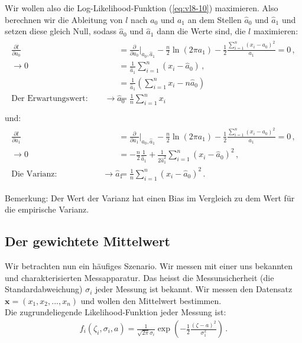 Wir wollen also die Log-Likelihood-Funktion (\cref{eq:vl8-10}) maximieren. Also berechnen wir die Ableitung von $l$ nach $a_0$ und $a_1$ an dem Stellen $\hat{a}_0$ und $\hat{a}_1$ und setzen diese gleich Null, sodass $\hat{a}_0$ und $\hat{a}_1$ dann die Werte sind, die $l$ maximieren:
\begin{align}
\begin{split}
\frac{ \partial l }{ \partial a_0 } &= \frac{ \partial }{ \partial a_0 } \bigg|_{\hat{a}_0, \hat{a}_1} - \frac{n}{2} \ln{ ( 2 \pi a_1 ) } - \frac{1}{2} \frac{ \sum_{i=1}^n (x_i - a_0)^2 }{ a_1 } = 0\,,\\
\rightarrow 0 &= \frac{1}{ \hat{a}_1} \sum_{i = 1}^n (x_i - \hat{a}_0)\,,\\
&=  \frac{1}{ \hat{a}_1} \left( \sum_{i = 1}^n x_i - n \hat{a}_0 \right)\\
\text{Der Erwartungswert:}\quad \quad \rightarrow \hat{a}_0 &= \frac{1}{n} \sum_{i = 1}^n x_i\\
\label{eq:vl8-11}
\end{split}
\end{align}
und:
\begin{align}
\begin{split}
\frac{ \partial l }{ \partial a_1 } &= \frac{ \partial }{ \partial a_1 } \bigg|_{\hat{a}_0, \hat{a}_1} - \frac{n}{2} \ln{ ( 2 \pi a_1 ) } - \frac{1}{2} \frac{ \sum_{i=1}^n (x_i - a_0)^2 }{ a_1 } = 0\,,\\
\rightarrow 0 &= - \frac{n}{2}\frac{1}{ \hat{a}_1 } + \frac{1}{ 2 \hat{a}_1^2 }\sum_{i = 1}^n (x_i - \hat{a}_0)^2\,,\\
\text{Die Varianz:}\quad \quad \quad \quad \quad \enspace
\rightarrow \hat{a}_1 &= \frac{1}{n} \sum_{i = 1}^n (x_i - \hat{a}_0)^2\,.
\label{eq:vl8-12}
\end{split}
\end{align}

Bemerkung: Der Wert der Varianz hat einen Bias im Vergleich zu dem Wert f\"ur die empirische Varianz.


\subsection{Der gewichtete Mittelwert}
\label{subsec:vl8-3}

Wir betrachten nun ein h\"aufiges Szenario. Wir messen mit einer uns bekannten und charakterisierten Messapparatur. Das heisst die Messunsicherheit (die Standardabweichung) $\sigma_i$ jeder Messung ist bekannt. Wir messen den Datensatz $\boldsymbol{x} = (x_1, x_2, ..., x_n)$ und wollen den Mittelwert bestimmen.\\
Die zugrundeliegende Likelihood-Funktion jeder Messung ist:
\begin{align}
f_i(\zeta_i, \sigma_i, a) = \frac{1}{ \sqrt{2 \pi } \sigma_i} \exp \left( - \frac{1}{2} \frac{ (\zeta - a)^2 }{ \sigma_1^2 } \right)\,.
\label{eq:vl8-13}
\end{align}

